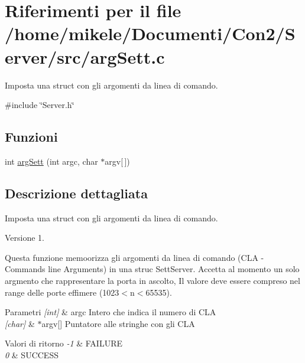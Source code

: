 \hypertarget{a00005}{}\section{Riferimenti per il file /home/mikele/\+Documenti/\+Con2/\+Server/src/arg\+Sett.c}
\label{a00005}


Imposta una struct con gli argomenti da linea di comando.  


{\ttfamily \#include \char`\"{}Server.\+h\char`\"{}}\newline
\subsection*{Funzioni}
\begin{DoxyCompactItemize}
\item 
int \mbox{\hyperlink{a00005_a169605f11035e9caf2dd6f0479c2dc18}{arg\+Sett}} (int argc, char $\ast$argv\mbox{[}$\,$\mbox{]})
\end{DoxyCompactItemize}


\subsection{Descrizione dettagliata}
Imposta una struct con gli argomenti da linea di comando. 





\begin{DoxyVersion}{Versione}
1.
\end{DoxyVersion}
Questa funzione memoorizza gli argomenti da linea di comando (C\+LA -\/ Commands line Arguments) in una struc Sett\+Server. Accetta al momento un solo argmento che rappresentare la porta in ascolto, Il valore deve essere compreso nel range delle porte effimere (1023$<$n$<$65535).


\begin{DoxyParams}{Parametri}
{\em \mbox{[}int\mbox{]}} & argc Intero che indica il numero di C\+LA \\
\hline
{\em \mbox{[}char\mbox{]}} & $\ast$argv\mbox{[}\mbox{]} Puntatore alle stringhe con gli C\+LA\\
\hline
\end{DoxyParams}

\begin{DoxyRetVals}{Valori di ritorno}
{\em -\/1} & F\+A\+I\+L\+U\+RE \\
\hline
{\em 0} & S\+U\+C\+C\+E\+SS \\
\hline
\end{DoxyRetVals}


